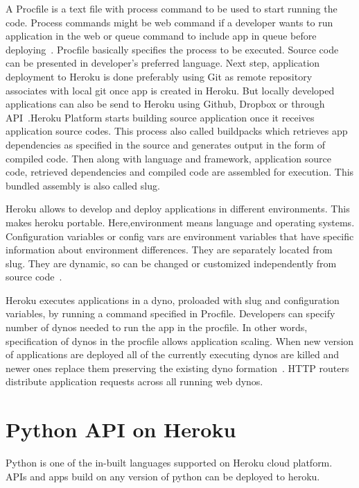  A Procfile is a text file with 
 process command to be used to start running the code. Process commands might
 be web command if a developer wants to run application in the web or queue
 command to include app in queue before deploying~\cite{www-how-heroku-works}.
 Procfile basically specifies the process to be executed.
 Source code can be presented in developer's preferred language.
Next step, application deployment to Heroku is done preferably using Git
 as remote repository associates with local git  once app is created in Heroku.
 But locally developed applications can also be send to Heroku using Github,
 Dropbox or through API~\cite{www-how-heroku-works}.Heroku Platform starts 
 building source application once it receives application source codes. This 
 process also called buildpacks which retrieves app dependencies as specified 
 in the source and generates output in the form of compiled code. Then along
 with language and framework, application source code, retrieved dependencies
 and compiled code are assembled for execution. This bundled assembly is also
 called slug.

 Heroku allows to develop and deploy applications in different environments.
 This makes heroku portable. Here,environment means language and operating
 systems. Configuration variables or config vars are environment variables
 that have specific information about environment differences. They are
 separately located from slug. They are dynamic, so can be changed or
 customized independently from source code~\cite{www-how-heroku-works}.

Heroku executes applications in a dyno, proloaded with slug and configuration
 variables, by running a command specified in Procfile. Developers can specify
 number of dynos needed to run the app in the procfile. In other words,
 specification of dynos in the procfile allows application scaling. When new
 version of applications are deployed all of the currently executing dynos are
 killed and newer ones replace them preserving the existing dyno
 formation~\cite{www-how-heroku-works}. HTTP routers distribute application
 requests across all running web dynos. 


\section{Python API on Heroku}
Python is one of the in-built languages supported on Heroku cloud platform.
 APIs and apps build on any version of python can be deployed to heroku.

